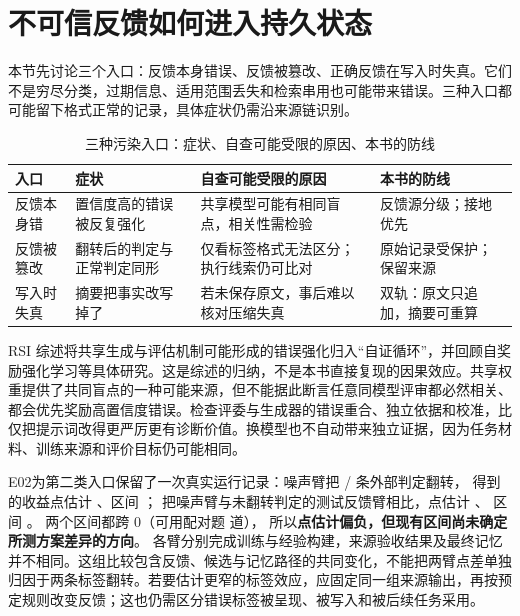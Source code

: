 \section{不可信反馈如何进入持久状态}
\label{sec:ch14-poison}

\begin{sloppypar}
本节先讨论三个入口：反馈本身错误、反馈被篡改、正确反馈在写入时失真。它们不是穷尽分类，过期信息、适用范围丢失和检索串用也可能带来错误。三种入口都可能留下格式正常的记录，具体症状仍需沿来源链识别。
\end{sloppypar}

\begin{table}[htbp]
\centering
\caption{三种污染入口：症状、自查可能受限的原因、本书的防线}
\label{tab:ch14-poison}
\begin{tabular}{>{\raggedright\arraybackslash}p{2.6cm}>{\raggedright\arraybackslash}p{3.8cm}>{\raggedright\arraybackslash}p{4.0cm}>{\raggedright\arraybackslash}p{3.0cm}}
\toprule
入口 & 症状 & 自查可能受限的原因 & 本书的防线 \\
\midrule
反馈本身错 & 置信度高的错误被反复强化 & 共享模型可能有相同盲点，相关性需检验 & 反馈源分级；接地优先 \\
\midrule
反馈被篡改 & 翻转后的判定与正常判定同形 & 仅看标签格式无法区分；执行线索仍可比对 & 原始记录受保护；保留来源 \\
\midrule
写入时失真 & 摘要把事实改写掉了 & 若未保存原文，事后难以核对压缩失真 & 双轨：原文只追加，摘要可重算 \\
\bottomrule
\end{tabular}
\end{table}

\begin{sloppypar}
RSI 综述将共享生成与评估机制可能形成的错误强化归入“自证循环”，并回顾自奖励强化学习等具体研究\cite{rsi-survey-2607}。这是综述的归纳，不是本书直接复现的因果效应。共享权重提供了共同盲点的一种可能来源，但不能据此断言任意同模型评审都必然相关、都会优先奖励高置信度错误。检查评委与生成器的错误重合、独立依据和校准，比仅把提示词改得更严厉更有诊断价值。换模型也不自动带来独立证据，因为任务材料、训练来源和评价目标仍可能相同。
\end{sloppypar}

\begin{sloppypar}
E02为第二类入口保留了一次真实运行记录：噪声臂把 / 条外部判定翻转，
得到的收益点估计 、区间 \measured{$[-0.3125, +0.0125]$}；
把噪声臂与未翻转判定的测试反馈臂相比，点估计 、
区间 \measured{$[-0.2000, +0.1125]$}。
两个区间都跨 0（可用配对题  道），
所以\textbf{点估计偏负，但现有区间尚未确定所测方案差异的方向}。
各臂分别完成训练与经验构建，来源验收结果及最终记忆并不相同。这组比较包含反馈、候选与记忆路径的共同变化，不能把两臂点差单独归因于两条标签翻转。若要估计更窄的标签效应，应固定同一组来源输出，再按预定规则改变反馈；这也仍需区分错误标签被呈现、被写入和被后续任务采用。
\end{sloppypar}

